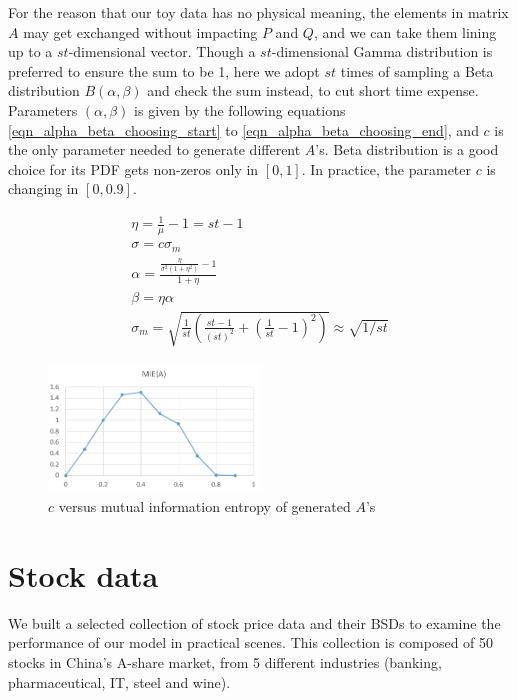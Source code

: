 \documentclass[12pt]{article}
\begin{document}
For the reason that our toy data has no physical meaning, the elements in matrix $A$ may get exchanged without impacting $P$ and $Q$, and we can take them lining up to a $st$-dimensional vector. Though a $st$-dimensional Gamma distribution is preferred to ensure the sum to be 1, here we adopt $st$ times of sampling a Beta distribution $B(\alpha, \beta)$ and check the sum instead, to cut short time expense. Parameters $(\alpha, \beta)$ is given by the following equations \ref{eqn_alpha_beta_choosing_start} to \ref{eqn_alpha_beta_choosing_end}, and $c$ is the only parameter needed to generate different $A$'s. Beta distribution is a good choice for its PDF gets non-zeros only in $[0, 1]$. In practice, the parameter $c$ is changing in $[0, 0.9]$.

\begin{eqnarray}
\label{eqn_alpha_beta_choosing_start}
\eta = \frac{1}{\mu} - 1 = st - 1 \\
\sigma = c \sigma_m \\
\alpha = \frac{\frac{\eta}{\sigma^2(1+\eta^2)}-1}{1+\eta} \\
\beta = \eta \alpha \\
\sigma_m = \sqrt{\frac{1}{st} \left( \frac{st-1}{(st)^2} + \left( \frac{1}{st} - 1 \right)^2 \right)} \approx \sqrt{1/st}
\label{eqn_alpha_beta_choosing_end}
\end{eqnarray}

\begin{figure}
\small
\centering
\includegraphics[width=0.5\textwidth]{c_vs_ent.png}
\caption{$c$ versus mutual information entropy of generated $A$'s}
\label{fig_c_vs_ent}
\end{figure}

\section{Stock data}
We built a selected collection of stock price data and their BSDs to examine the performance of our model in practical scenes. This collection is composed of 50 stocks in China's A-share market, from 5 different industries (banking, pharmaceutical, IT, steel and wine).
\end{document}
